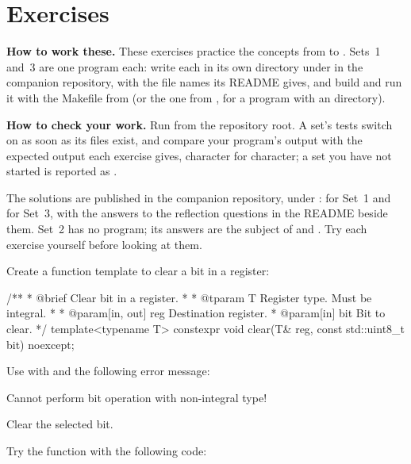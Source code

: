 
\section{Exercises}
\label{c5:sec:exercises}\label{c5:app:d}

\begin{aside}
\textbf{How to work these.} These exercises practice the concepts from  to
. Sets~1 and~3 are one program each: write each in its own directory under
 in the companion repository, with the file names its README gives, and
build and run it with the Makefile from  (or the one from
, for a program with an  directory).

\textbf{How to check your work.} Run  from the repository root. A set's tests switch
on as soon as its files exist, and compare your program's output with the expected output each
exercise gives, character for character; a set you have not started is reported as .

The solutions are published in the companion repository, under
:  for Set~1 and 
for Set~3, with the answers to the reflection questions in the README beside them. Set~2 has no
program; its answers are the subject of  and
. Try each exercise yourself before looking at
them.
\end{aside}

\label{c5:set:1}

\label{c5:ex:1.1}
Create a function template to clear a bit in a register:

\begin{cppcode}
/**
 * @brief Clear bit in a register.
 *
 * @tparam T Register type. Must be integral.
 *
 * @param[in, out] reg Destination register.
 * @param[in] bit Bit to clear.
 */
template<typename T>
constexpr void clear(T& reg, const std::uint8_t bit) noexcept;
\end{cppcode}

\begin{parts}
  \item Use  with  and the following error
    message:
\begin{console}
Cannot perform bit operation with non-integral type!
\end{console}
  \item Clear the selected bit.
  \item Try the  function with the following code:
\end{parts}

